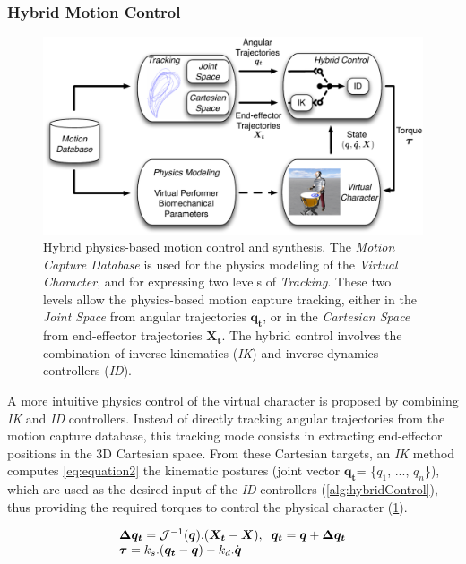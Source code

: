 		\subsubsection{Hybrid Motion Control}
		\label{subsec:Synthesis_Physics_MotionControl_CartesianSpaceControl}

\begin{figure}%
	\centering
	\includegraphics[width=0.9\linewidth]{Chapters/5/Pics/Pdf/hybridControl.pdf}
	\caption[Hybrid physics-based motion control and synthesis]{Hybrid physics-based motion control and synthesis. The \emph{Motion Capture Database} is used for the physics modeling of the \emph{Virtual Character}, and for expressing two levels of \emph{Tracking}. These two levels allow the physics-based motion capture tracking, either in the \emph{Joint Space} from angular trajectories $\boldsymbol{q_t}$, or in the \emph{Cartesian Space} from end-effector trajectories $\boldsymbol{X_t}$. The hybrid control involves the combination of inverse kinematics (\emph{IK}) and inverse dynamics controllers (\emph{ID}).}
	\label{fig:motionSynthesis}
\end{figure}

A more intuitive physics control of the virtual character is proposed by combining \emph{IK} and \emph{ID} controllers. Instead of directly tracking angular trajectories from the motion capture database, this tracking mode consists in extracting end-effector positions in the 3D Cartesian space. From these Cartesian targets, an \emph{IK} method computes \myequname \eqref{eq:equation2} the kinematic postures (joint vector $\boldsymbol{q_t} $= \{$q_1$, ..., $q_n$\}), which are used as the desired input of the \emph{ID} controllers (\myalgname \ref{alg:hybridControl}), thus providing the required torques to control the physical character (\myfigname \ref{fig:motionSynthesis}).

\begin{equation}
	\begin{array}{l}
		\boldsymbol{\Delta q_t} = \mathcal{J}^{-1}(\boldsymbol{q}).(\boldsymbol{X_t} - \boldsymbol{X}), \hspace{2mm} \boldsymbol{q_t} = \boldsymbol{q} + \boldsymbol{\Delta q_t} \\
		\boldsymbol{\tau} = k_s . (\boldsymbol{q_t} - \boldsymbol{q}) -  k_d . \dot{\boldsymbol{q}}
	\end{array}
\label{eq:equation2}
\eqcaption{\emph{IK} control involved in the hybrid motion control}
\end{equation}

